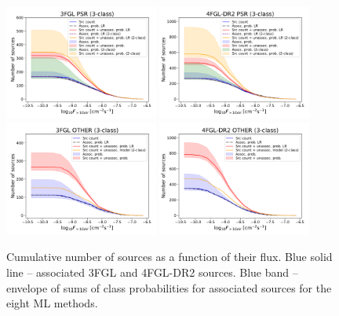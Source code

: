 \begin{figure}[h]
\centering
\includegraphics[width=0.45\textwidth]{plots/N_logS_3FGL_PSR_3classes.pdf}
\includegraphics[width=0.45\textwidth]{plots/N_logS_4FGL-DR2_PSR_3classes.pdf} \\
\includegraphics[width=0.45\textwidth]{plots/N_logS_3FGL_OTHER_3classes.pdf}
\includegraphics[width=0.45\textwidth]{plots/N_logS_4FGL-DR2_OTHER_3classes.pdf}
\caption{Cumulative number of sources as a function of their flux. 
Blue solid line -- associated 3FGL and 4FGL-DR2  sources. 
Blue band -- envelope of sums of class probabilities for associated sources for the eight ML methods. 
}
\end{figure}
